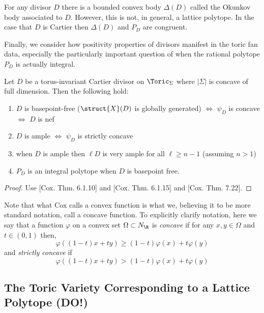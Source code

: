 \documentclass[12pt]{article}
\begin{document}
\begin{rmk}
For any divisor $D$ there is a bounded convex body $\Delta(D)$ called the Okunkov body associated to $D$. However, this is not, in general, a lattice polytope. In the case that $D$ is Cartier then $\Delta(D)$ and $P_D$ are congruent. 
\end{rmk}
\noindent
Finally, we consider how positivity properties of divisors manifest in the toric fan data, especially the particularly important question of when the rational polytope $P_D$ is actually integral. 

\begin{theorem} \label{divisor_positivity}
Let $D$ be a torus-invariant Cartier divisor on $\Toric_\Sigma$ where $|\Sigma|$ is concave of full dimension. Then the following hold:
\begin{enumerate}
\item $D$ is basepoint-free ($\struct{X}(D)$ is globally generated) $\iff$ $\psi_D$ is concave $\iff$ $D$ is nef
\item $D$ is ample $\iff$ $\psi_D$ is strictly concave 
\item when $D$ is ample then $\ell D$ is very ample for all $\ell \ge n - 1$ (assuming $n > 1$)
\item $P_D$ is an integral polytope when $D$ is basepoint free. 
\end{enumerate}
\end{theorem}

\begin{proof}
Use [Cox. Thm. 6.1.10] and [Cox. Thm. 6.1.15] and [Cox. Thm. 7.22].
\end{proof}

\begin{rmk}
Note that what Cox calls a convex function is what we, believing it to be more standard notation, call a concave function. To explicitly clarify notation, here we say that a function $\varphi$ on a convex set $\Omega \subset N_\R$ is \textit{concave} if for any $x, y \in \Omega$ and $t \in (0, 1)$ then,
\[ \varphi((1 - t) x + t y) \ge (1 - t) \varphi(x) + t \varphi(y) \]
and \textit{strictly concave} if 
\[ \varphi((1 - t) x + t y) > (1 - t) \varphi(x) + t \varphi(y) \]
\end{rmk}

\subsection{The Toric Variety Corresponding to a Lattice Polytope (DO!)}
\end{document}
